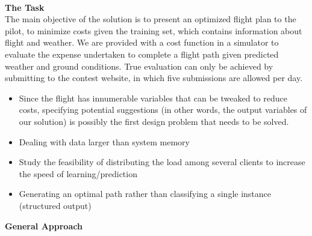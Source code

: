 \documentclass{article}[9pt]
\begin{document}
\\[\baselineskip]
\noindent
\Large{\textbf{The Task}} \\
\noindent The main objective of the solution is to present an optimized flight plan to the pilot, to minimize costs given the training set, which contains information about flight and weather. We are provided with a cost function in a simulator to evaluate the expense undertaken to complete a flight path given predicted weather and ground conditions. True evaluation can only be achieved by submitting to the contest website, in which five submissions are allowed per day.
\begin{itemize}
	\item Since the flight has innumerable variables that can be tweaked to reduce costs, specifying potential suggestions (in other words, the output variables of our solution) is possibly the first design problem that needs to be solved.
	\item Dealing with data larger than system memory
	\item Study the feasibility of distributing the load among several clients to increase the speed of learning/prediction
	\item Generating an optimal path rather than classifying a single instance (structured output)
\end{itemize}
\noindent
\Large{\textbf{General Approach}}%
\end{document}

